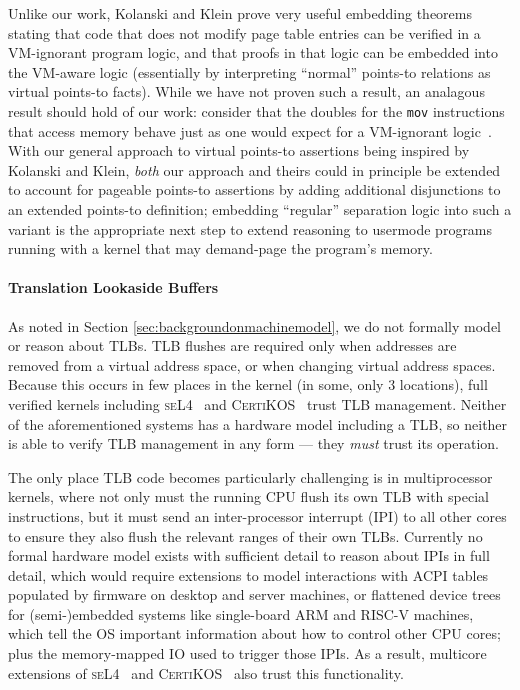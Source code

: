 Unlike our work, Kolanski and Klein prove very useful embedding theorems stating that code that does not modify page table 
entries can be verified in a VM-ignorant program logic, and that proofs in that logic can be embedded into the VM-aware logic 
(essentially by interpreting ``normal'' points-to relations as virtual points-to facts). While we have not proven such a result,
an analagous result {should} hold of our work: consider that the doubles for the \texttt{mov} instructions
that access memory behave just as one would expect for a VM-ignorant logic~\cite{Chlipala2013Bedrock}.
With our general approach to virtual points-to assertions being inspired by Kolanski and Klein, \emph{both}
 our approach and theirs could in principle be extended to account for pageable points-to assertions by adding additional 
disjunctions to an extended points-to definition; embedding ``regular'' separation logic into such a variant
is the appropriate next step to extend reasoning to usermode programs running with a kernel that may demand-page the program's
memory.

\paragraph{Translation Lookaside Buffers}
As noted in Section \ref{sec:backgroundonmachinemodel}, we do not formally model or reason about TLBs.
TLB flushes are required only when addresses are removed from a virtual address space, or when changing
virtual address spaces. Because this occurs in few places in the kernel (in some, only 3 locations), full verified
kernels including \textsc{seL4}~\cite{Klein2009seL4,seL4TOCS} and \textsc{CertiKOS}~\cite{gu15,gu2016certikos}
trust TLB management. Neither of the aforementioned systems has a hardware model including a TLB, so neither is able
to verify TLB management in any form --- they \emph{must} trust its operation.

The only place TLB code becomes particularly challenging is in multiprocessor kernels, where
not only must the running CPU flush its own TLB with special instructions, but it must send an inter-processor interrupt (IPI) to all
other cores to ensure they also flush the relevant ranges of their own TLBs.
Currently no formal hardware model exists with sufficient detail to reason about IPIs in full detail,
which would require extensions to model interactions with ACPI tables populated by firmware on desktop and server machines,
or flattened device trees for (semi-)embedded systems like single-board ARM and RISC-V machines, which tell the OS
important information about how to control other CPU cores;
plus the memory-mapped IO used to trigger those IPIs.
As a result, multicore extensions of \textsc{seL4}~\cite{von2013clustered} and \textsc{CertiKOS}~\cite{gu2016certikos} also trust this functionality.

